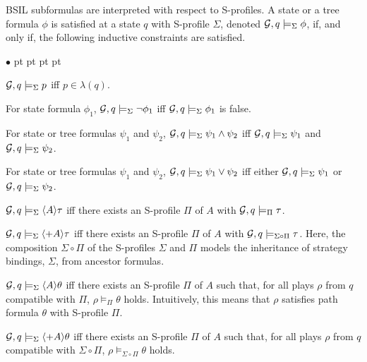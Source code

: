 \documentclass[11pt]{article}
\newcommand{\calg}{{\cal G}}
\newenvironment{list1}{\begin{list}{$\bullet$}
{\topsep 0 pt \parsep 0 pt \partopsep 0 pt \itemsep 0 pt}}{\end{list}}
\begin{document}
BSIL subformulas are interpreted with respect to S-profiles.  
A state or a tree formula $\phi$ is satisfied 
at a state $q$ with S-profile $\Sigma$, denoted $\calg,q\models_\Sigma\phi$, if,
and only if, the following inductive constraints are satisfied.
\begin{list1}
\item $\calg,q\models_\Sigma p$ iff $p\in \lambda(q)$.
\item For state formula $\phi_1$, 
    $\calg,q\models_\Sigma\neg\phi_1$ iff
    $\calg,q\models_\Sigma\phi_1$ is false.
\item For state or tree formulas $\psi_1$ and $\psi_2$, 
    $\calg,q\models_\Sigma\psi_1\wedge\psi_2$ iff
    $\calg,q\models_\Sigma\psi_1$
    and $\calg,q\models_\Sigma\psi_2$.
\item For state or tree formulas $\psi_1$ and $\psi_2$, 
    $\calg,q\models_\Sigma\psi_1\vee\psi_2$ iff
    either $\calg,q\models_\Sigma\psi_1$
    or $\calg,q\models_\Sigma\psi_2$.
\item $\calg,q\models_\Sigma\langle A\rangle\tau$
    iff there exists an S-profile $\Pi$ of $A$
    with $\calg,q\models_{\Pi}\tau$.  
\item $\calg,q\models_\Sigma\langle+A\rangle\tau$
    iff there exists an S-profile $\Pi$ of $A$
    with $\calg,q\models_{\Sigma\circ\Pi}\tau$.  
    Here, the composition $\Sigma\circ\Pi$ of the S-profiles $\Sigma$ and $\Pi$
    models the inheritance of 
    strategy bindings, $\Sigma$, from ancestor formulas. 
\item $\calg,q\models_\Sigma\langle A\rangle\theta$
    iff there exists an S-profile $\Pi$ of $A$ such that,
    for all plays $\rho$ from $q$ compatible with $\Pi$,
    $\rho\models_{\Pi}\theta$ holds.
    Intuitively, this means that $\rho$ satisfies path formula $\theta$ with S-profile $\Pi$.  
\item $\calg,q\models_\Sigma\langle + A\rangle\theta$
    iff there exists an S-profile $\Pi$ of $A$ such that, 
    for all plays $\rho$ from $q$ compatible with ${\Sigma\circ\Pi}$,
    $\rho\models_{\Sigma\circ\Pi}\theta$ holds.  
\end{list1} 
\end{document}
